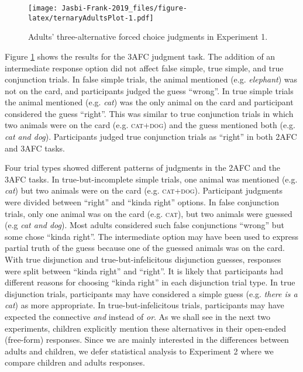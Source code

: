 \documentclass[,man,floatsintext]{apa6}
\begin{document}
\begin{figure}
\centering
\texttt{[image: Jasbi-Frank-2019\_files/figure-latex/ternaryAdultsPlot-1.pdf]}
\caption{\label{fig:ternaryAdultsPlot}Adults' three-alternative forced choice judgments in Experiment 1.}
\end{figure}

Figure \ref{fig:ternaryAdultsPlot} shows the results for the 3AFC judgment task. The addition of an intermediate response option did not affect false simple, true simple, and true conjunction trials. In false simple trials, the animal mentioned (e.g. \emph{elephant}) was not on the card, and participants judged the guess \enquote{wrong}. In true simple trials the animal mentioned (e.g. \emph{cat}) was the only animal on the card and participant considered the guess \enquote{right}. This was similar to true conjunction trials in which two animals were on the card (e.g. \textsc{cat+dog}) and the guess mentioned both (e.g. \emph{cat and dog}). Participants judged true conjunction trials as \enquote{right} in both 2AFC and 3AFC tasks.

Four trial types showed different patterns of judgments in the 2AFC and the 3AFC tasks. In true-but-incomplete simple trials, one animal was mentioned (e.g. \emph{cat}) but two animals were on the card (e.g. \textsc{cat+dog}). Participant judgments were divided between \enquote{right} and \enquote{kinda right} options. In false conjunction trials, only one animal was on the card (e.g. \textsc{cat}), but two animals were guessed (e.g \emph{cat and dog}). Most adults considered such false conjunctions \enquote{wrong} but some chose \enquote{kinda right}. The intermediate option may have been used to express partial truth of the guess because one of the guessed animals was on the card. With true disjunction and true-but-infelicitous disjunction guesses, responses were split between \enquote{kinda right} and \enquote{right}. It is likely that participants had different reasons for choosing \enquote{kinda right} in each disjunction trial type. In true disjunction trials, participants may have considered a simple guess (e.g. \emph{there is a cat}) as more appropriate. In true-but-infelicitous trials, participants may have expected the connective \emph{and} instead of \emph{or}. As we shall see in the next two experiments, children explicitly mention these alternatives in their open-ended (free-form) responses. Since we are mainly interested in the differences between adults and children, we defer statistical analysis to Experiment 2 where we compare children and adults responses.
\end{document}
